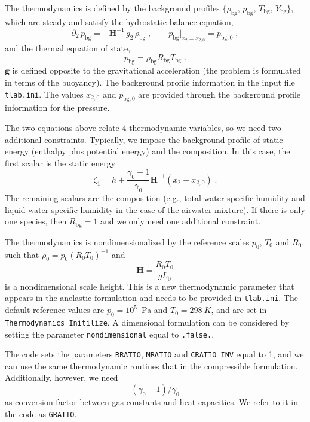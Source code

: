 The thermodynamics is defined by the background profiles $\{\rho_\mathrm{bg},\, p_\mathrm{bg},\, T_\mathrm{bg},\, Y_\mathrm{bg}\}$, which are steady and satisfy the hydrostatic balance equation,
\begin{equation}
    \partial_2\,p_\mathrm{bg}=-\mathbf{H}^{-1}\, g_2\,\rho_\mathrm{bg}\;,\qquad p_\mathrm{bg}|_{x_2=x_{2,0}}=p_{\mathrm{bg},0}\;,
\end{equation}
and the thermal equation of state,
\begin{equation}
    p_\mathrm{bg}  = \rho_\mathrm{bg} R_\mathrm{bg} T_\mathrm{bg} \;.
\end{equation}
$\mathbf{g}$ is defined opposite to the gravitational acceleration (the problem is formulated in terms of the buoyancy). The background profile information in the input file {\tt tlab.ini}. The values $x_{2,0}$ and $p_\mathrm{bg,0}$ are provided through the background profile information for the pressure. 

The two equations above relate 4 thermodynamic variables, so we need two additional constraints. Typically, we impose the background profile of static energy (enthalpy plus potential energy) and the composition. In this case, the first scalar is the static energy
\begin{equation}
    \zeta_1 = h + \frac{\gamma_0-1}{\gamma_0}\mathbf{H}^{-1}(x_2-x_{2,0}) \;.
\end{equation}
The remaining scalars are the composition (e.g., total water specific humidity and liquid water specific humidity in the case of the airwater mixture). If there is only one species, then $R_\mathrm{bg}=1$ and we only need one additional constraint. 

The thermodynamics is nondimensionalized by the reference scales $p_0$, $T_0$ and $R_0$, such that $\rho_0=p_0(R_0T_0)^{-1}$ and
\begin{equation}
    \mathbf{H} = \frac{R_0T_0}{gL_0}
\end{equation}
is a nondimensional scale height. This is a new thermodynamic parameter that appears in the anelastic formulation and needs to be provided in \texttt{tlab.ini}. The default reference values are $p_0=10^5$~Pa and $T_0=298~K$, and are set in \texttt{Thermodynamics\_Initilize}. A dimensional formulation can be considered by setting the parameter \texttt{nondimensional} equal to \texttt{.false.}.

The code sets the parameters \texttt{RRATIO}, \texttt{MRATIO} and \texttt{CRATIO\_INV} equal to 1, and we can use the same thermodynamic routines that in the compressible formulation. Additionally, however, we need 
\begin{equation}
    (\gamma_0-1)/\gamma_0
\end{equation}
as conversion factor between gas constants and heat capacities. We refer to it in the code as \texttt{GRATIO}.

